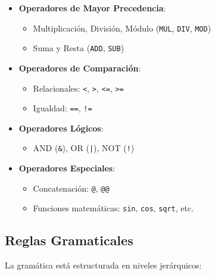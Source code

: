 \documentclass[11pt, a4paper, twoside]{article} %
\begin{document}
\begin{itemize}
    \item \textbf{Operadores de Mayor Precedencia}:
    \begin{itemize}
        \item Multiplicación, División, Módulo (\texttt{MUL}, \texttt{DIV}, \texttt{MOD})
        \item Suma y Resta (\texttt{ADD}, \texttt{SUB})
    \end{itemize}

    \item \textbf{Operadores de Comparación}:
    \begin{itemize}
        \item Relacionales: \texttt{<}, \texttt{>}, \texttt{<=}, \texttt{>=}
        \item Igualdad: \texttt{==}, \texttt{!=}
    \end{itemize}

    \item \textbf{Operadores Lógicos}:
    \begin{itemize}
        \item AND (\texttt{\&}), OR (\texttt{|}), NOT (\texttt{!})
    \end{itemize}

    \item \textbf{Operadores Especiales}:
    \begin{itemize}
        \item Concatenación: \texttt{@}, \texttt{@@}
        \item Funciones matemáticas: \texttt{sin}, \texttt{cos}, \texttt{sqrt}, etc.
    \end{itemize}
\end{itemize}

\subsection{Reglas Gramaticales}

La gramática está estructurada en niveles jerárquicos:
\end{document}
